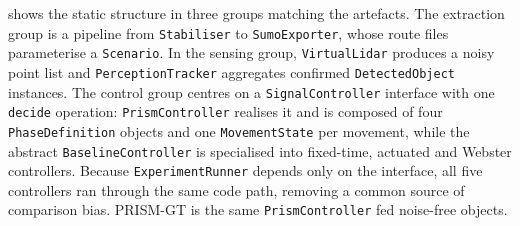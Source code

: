 \begin{sloppypar}
 shows the static structure in three groups matching the artefacts. The extraction group is a pipeline from \texttt{Stabiliser} to \texttt{SumoExporter}, whose route files parameterise a \texttt{Scenario}. In the sensing group, \texttt{VirtualLidar} produces a noisy point list and \texttt{PerceptionTracker} aggregates confirmed \texttt{DetectedObject} instances. The control group centres on a \texttt{SignalController} interface with one \texttt{decide} operation: \texttt{PrismController} realises it and is composed of four \texttt{PhaseDefinition} objects and one \texttt{MovementState} per movement, while the abstract \texttt{BaselineController} is specialised into fixed-time, actuated and Webster controllers. Because \texttt{ExperimentRunner} depends only on the interface, all five controllers ran through the same code path, removing a common source of comparison bias. PRISM-GT is the same \texttt{PrismController} fed noise-free objects.
\end{sloppypar}

